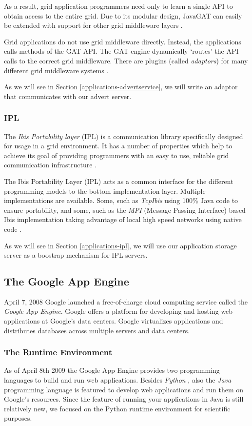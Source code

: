 As a result, grid application programmers need only to learn a single API to
obtain access to the entire grid. Due to its modular design, JavaGAT can easily
be extended with support for other grid middleware layers \cite{javagat-www}.

Grid applications do not use grid middleware directly. Instead, the
applications calls methods of the GAT API. The GAT engine dynamically `routes'
the API calls to the correct grid middleware. There are plugins (called
\emph{adaptors}) for many different grid middleware systems \cite{javagat-www}.

As we will see in Section \ref{applications-advertservice}, we will write an
adaptor that communicates with our advert server.

\subsubsection{IPL}
The \emph{Ibis Portability layer} (IPL) is a communication library specifically
designed for usage in a grid environment. It has a number of properties which
help to achieve its goal of providing programmers with an easy to use, reliable
grid communication infrastructure \cite{ibis-www}.

The Ibis Portability Layer (IPL) acts as a common interface for the different
programming models to the bottom implementation layer. Multiple implementations
are available. Some, such as \emph{TcpIbis} using 100\% Java code to ensure
portability, and some, such as the \emph{MPI} (Message Passing Interface) based
Ibis implementation taking advantage of local high speed networks using native
code \cite{ibis-www}.

As we will see in Section \ref{applications-ipl}, we will use our application
storage server as a boostrap mechanism for IPL servers.

\subsection{The Google App Engine}
\label{related-appengine}
April 7, 2008 Google launched a free-of-charge cloud computing service called
the \emph{Google App Engine}. Google offers a platform for developing and
hosting web applications at Google's data centers. Google virtualizes
applications and distributes databases across multiple servers and data centers.

\subsubsection{The Runtime Environment}
As of April 8th 2009 \cite{app-engine-java} the Google App Engine provides two
programming languages to build and run web applications. Besides \emph{Python}
\cite{python-www}, also the \emph{Java} \cite{java-www} programming language is
featured to develop web applications and run them on Google's resources. Since
the feature of running your applications in Java is still relatively new, we
focused on the Python runtime environment for scientific purposes.

